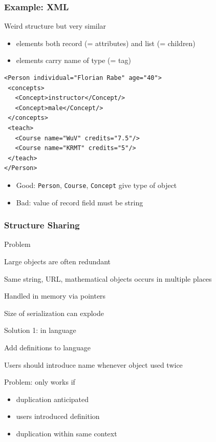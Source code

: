 \begin{frame}[fragile]\frametitle{Example: XML}
Weird structure but very similar
\begin{itemize}
\item elements both record (= attributes) and list (= children)
\item elements carry name of type (= tag)
\end{itemize}

\begin{lstlisting}[basicstyle=\footnotesize]
<Person individual="Florian Rabe" age="40">
 <concepts>
   <Concept>instructor</Concept/>
   <Concept>male</Concept/>
 </concepts>
 <teach>
   <Course name="WuV" credits="7.5"/>
   <Course name="KRMT" credits="5"/>
 </teach>
</Person>
\end{lstlisting}

\begin{itemize}
\item Good: \lstinline|Person|, \lstinline|Course|, \lstinline|Concept| give type of object
\item Bad: value of record field must be string
\end{itemize}
\end{frame}

\begin{frame}\frametitle{Structure Sharing}
\begin{blockitems}{Problem}
\item Large objects are often redundant
\item Same string, URL, mathematical objects occurs in multiple places
\item Handled in memory via pointers
\item Size of serialization can explode
\end{blockitems}

\begin{blockitems}{Solution 1: in language}
\item Add definitions to language
\item Users should introduce name whenever object used twice
\item Problem: only works if 
 \begin{itemize}
  \item duplication anticipated
  \item users introduced definition
  \item duplication within same context
 \end{itemize}
\end{blockitems}
\end{frame}

